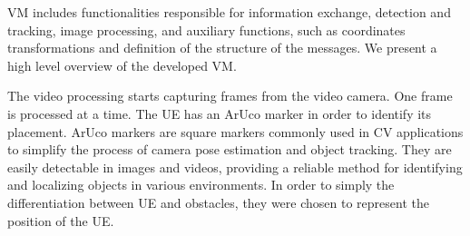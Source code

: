 \begin{table}[H]
    \caption{Summary of each message type.}
    \label{tab:message_type}
    \centering
\end{table}

VM includes functionalities responsible for information exchange, detection and tracking, image processing, and auxiliary functions, such as coordinates transformations and definition of the structure of the messages.
We present a high level overview of the developed VM\@.

The video processing starts capturing frames from the video camera.
One frame is processed at a time.
The UE has an ArUco marker in order to identify its placement.
ArUco markers are square markers commonly used in CV applications to simplify the process of camera pose estimation and object tracking.
They are easily detectable in images and videos, providing a reliable method for identifying and localizing objects in various environments.
In order to simply the differentiation between UE and obstacles, they were chosen to represent the position of the UE\@.

